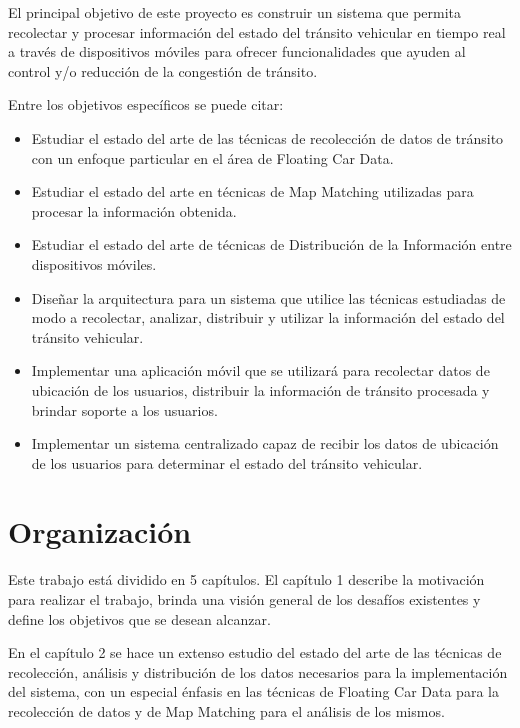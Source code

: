El principal objetivo de este proyecto es construir un sistema que permita recolectar y procesar información del estado del tránsito vehicular en tiempo real a través de dispositivos móviles para ofrecer funcionalidades que ayuden al control y/o reducción de la congestión de tránsito.

Entre los objetivos específicos se puede citar:

\begin{itemize}

\item Estudiar el estado del arte de las técnicas de recolección de datos de tránsito con un enfoque particular en el área de Floating Car Data.

\item Estudiar el estado del arte en técnicas de Map Matching utilizadas para procesar la información obtenida.

\item Estudiar el estado del arte de técnicas de Distribución de la Información entre dispositivos móviles.

\item Diseñar la arquitectura para un sistema que utilice las técnicas estudiadas de modo a recolectar, analizar, distribuir y utilizar la información del estado del tránsito vehicular.

\item Implementar una aplicación móvil que se utilizará para recolectar datos de ubicación de los usuarios, distribuir la información de tránsito procesada y brindar soporte a los usuarios.

\item Implementar un sistema centralizado capaz de recibir los datos de ubicación de los usuarios para determinar el estado del tránsito vehicular.

\end{itemize}

\section{Organización}

Este trabajo está dividido en 5 capítulos. El capítulo 1 describe la motivación para realizar el trabajo, brinda una visión general de los desafíos existentes y define los objetivos que se desean alcanzar.


En el capítulo 2 se hace un extenso estudio del estado del arte de las técnicas de recolección, análisis y distribución de los datos necesarios para la implementación del sistema, con un especial énfasis en las técnicas de Floating Car Data para la recolección de datos y de Map Matching para el análisis de los mismos.

